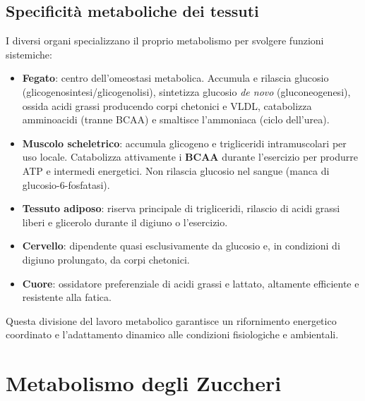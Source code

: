 \documentclass[12pt,a4paper]{report}
\begin{document}
\section{Specificità metaboliche dei tessuti}
I diversi organi specializzano il proprio metabolismo per svolgere funzioni sistemiche:
\begin{itemize}
\item \textbf{Fegato}: centro dell'omeostasi metabolica. Accumula e rilascia glucosio (glicogenosintesi/glicogenolisi), sintetizza glucosio \textit{de novo} (gluconeogenesi), ossida acidi grassi producendo corpi chetonici e VLDL, catabolizza amminoacidi (tranne BCAA) e smaltisce l'ammoniaca (ciclo dell'urea).
\item \textbf{Muscolo scheletrico}: accumula glicogeno e trigliceridi intramuscolari per uso locale. Catabolizza attivamente i \textbf{BCAA} durante l'esercizio per produrre ATP e intermedi energetici. Non rilascia glucosio nel sangue (manca di glucosio-6-fosfatasi).
\item \textbf{Tessuto adiposo}: riserva principale di trigliceridi, rilascio di acidi grassi liberi e glicerolo durante il digiuno o l'esercizio.
\item \textbf{Cervello}: dipendente quasi esclusivamente da glucosio e, in condizioni di digiuno prolungato, da corpi chetonici.
\item \textbf{Cuore}: ossidatore preferenziale di acidi grassi e lattato, altamente efficiente e resistente alla fatica.
\end{itemize}
Questa divisione del lavoro metabolico garantisce un rifornimento energetico coordinato e l'adattamento dinamico alle condizioni fisiologiche e ambientali.

\chapter{Metabolismo degli Zuccheri}
\end{document}
